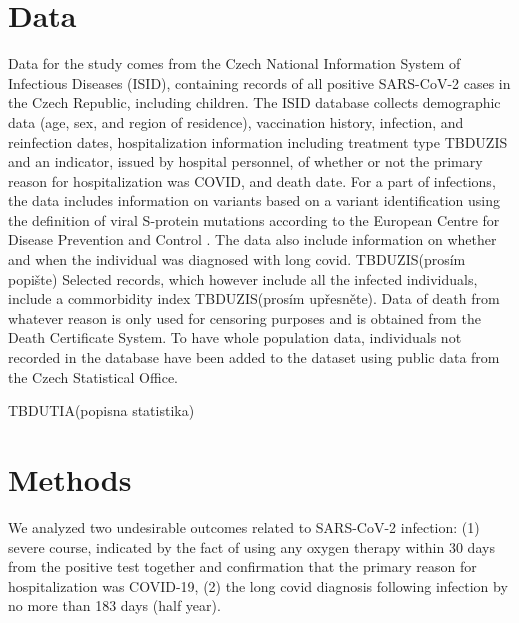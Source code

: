\documentclass[sn-basic]{sn-jnl}%
\theoremstyle{thmstyleone}%
\theoremstyle{thmstyletwo}%
\theoremstyle{thmstylethree}%
\begin{document}
\section{Data}

Data for the study comes from the Czech National Information System of Infectious Diseases (ISID), containing records of all positive SARS-CoV-2 cases in the Czech Republic, including children. The ISID database collects demographic data (age, sex, and region of residence), vaccination history, infection, and reinfection dates, hospitalization information including treatment type TBDUZIS and an indicator, issued by hospital personnel, of whether or not the primary reason for hospitalization was COVID, and death date. For a part of infections, the data includes information on variants based on a variant identification using the definition of viral S-protein mutations
according to the European Centre for Disease Prevention
and Control \cite{ECDC_var_concern}. The data also include information on whether and when the individual was diagnosed with long covid. TBDUZIS(prosím popište)
Selected records, which however include all the infected individuals, include a commorbidity index TBDUZIS(prosím upřesněte). Data of death from whatever reason is only used for censoring purposes and is obtained from the Death Certificate System. To have whole population data, individuals not recorded in the database have been added to the dataset using public data from the Czech Statistical Office. 

TBDUTIA(popisna statistika)

\section{Methods}

We analyzed two undesirable outcomes related to SARS-CoV-2 infection: (1) severe course, indicated by the fact of using any oxygen therapy within 30 days from the positive test together and confirmation that the primary reason for hospitalization was COVID-19, (2) the long covid diagnosis following infection by no more than 183 days (half year).
\end{document}

